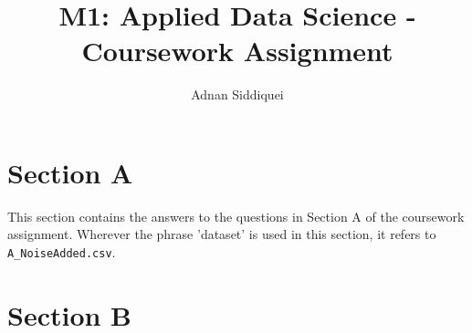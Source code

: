 \documentclass[a4paper,11pt]{article}
\title{\boldmath M1: Applied Data Science - Coursework Assignment}
\author{Adnan Siddiquei}
\affiliation{University of Cambridge}
\newcommand{\inlinecode}[1]{\lstinline{#1}}
\begin{document}
\maketitle
\flushbottom


\section{Section A}\label{sec:section-a}
This section contains the answers to the questions in Section A of the coursework assignment.
Wherever the phrase 'dataset' is used in this section, it refers to \inlinecode{A_NoiseAdded.csv}.




\section{Section B}\label{sec:section-b}



\begin{thebibliography}{99}


\end{thebibliography}
\end{document}
